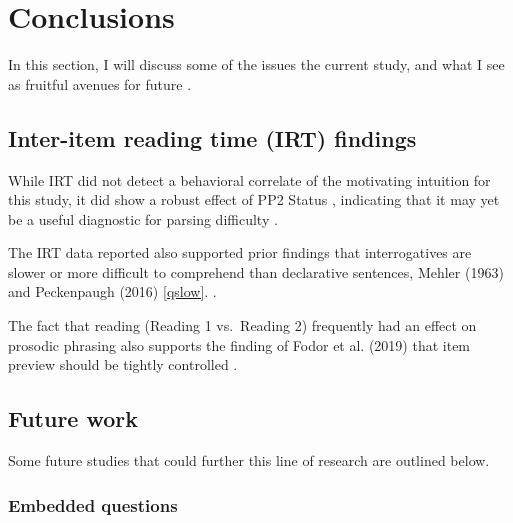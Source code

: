 \documentclass[12pt,oneside]{book}
\begin{document}
\hypertarget{confound}{%
\section{Conclusions}\label{confound}}

In this section, I will discuss some of the  issues  the current study, and what I see as fruitful avenues for future .

\hypertarget{inter-item-reading-time-irt-findings}{%
\subsection{Inter-item reading time (IRT) findings}\label{inter-item-reading-time-irt-findings}}


While IRT did not detect a behavioral correlate of the motivating intuition for this study, it did show a robust effect of PP2 Status , indicating that it may yet be a useful diagnostic for parsing difficulty .

The IRT data reported also supported prior findings that interrogatives are  slower  or more difficult to comprehend than  declarative sentences,  Mehler (1963) and Peckenpaugh (2016)  \ref{qslow}\added[id=JDF]{)}. .

The fact that reading (Reading 1 vs.~Reading 2) frequently had an effect on prosodic phrasing also supports the finding of Fodor et al. (2019) that  item preview should be tightly controlled .

\hypertarget{future-work}{%
\subsection{Future work}\label{future-work}}

Some future studies that could further this line of research are outlined below.

\hypertarget{embedded-questions}{%
\subsubsection{Embedded questions}\label{embedded-questions}}
\end{document}
